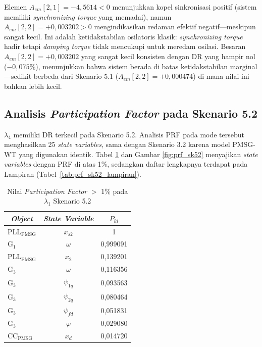 Elemen $A_{em}[2,1] = -4{,}5614 < 0$ menunjukkan kopel sinkronisasi positif
(sistem memiliki \textit{synchronizing torque} yang memadai), namun
$A_{em}[2,2] = +0{,}003202 > 0$ mengindikasikan redaman efektif negatif---meskipun
sangat kecil. Ini adalah ketidakstabilan osilatoris klasik: \textit{synchronizing
torque} hadir tetapi \textit{damping torque} tidak mencukupi untuk meredam osilasi.
Besaran $A_{em}[2,2] = +0{,}003202$ yang sangat kecil konsisten dengan DR yang
hampir nol ($-0{,}075\%$), menunjukkan bahwa sistem berada di batas
ketidakstabilan marginal---sedikit berbeda dari Skenario 5.1
($A_{em}[2,2] = +0{,}000474$) di mana nilai ini bahkan lebih kecil.

\subsection{Analisis \textit{Participation Factor} pada Skenario 5.2}

$\lambda_4$ memiliki DR terkecil pada Skenario 5.2. Analisis PRF pada mode
tersebut menghasilkan 25 \textit{state variables}, sama dengan Skenario 3.2
karena model PMSG-WT yang digunakan identik. Tabel \ref{tab:prf_sk52} dan Gambar \ref{fig:prf_sk52} menyajikan
\textit{state variables} dengan PRF di atas 1\%, sedangkan daftar lengkapnya
terdapat pada Lampiran (Tabel~\ref{tab:prf_sk52_lampiran}).

\begin{table}[h]
	\caption{Nilai \textit{Participation Factor} $>$ 1\% pada $\lambda_1$
	Skenario 5.2}
	\vspace{0.5em}
	\centering
	\fontsize{12}{14.4}\selectfont
	\setlength{\tabcolsep}{10pt}
	\begin{tabular}{l c c}
		\toprule
		\multicolumn{1}{c}{\textbf{\textit{Object}}} & \textbf{\textit{State
		Variable}} & \textbf{$P_{ki}$} \\
		\midrule
		PLL$_\text{PMSG}$ & $x_{s2}$ & 1         \\
		G$_1$ & $\omega$ & 0,999091  \\
		PLL$_\text{PMSG}$ & $x_2$ & 0,139201  \\
		G$_3$ & $\omega$ & 0,116356  \\
		G$_3$ & $\psi_{1q}$ & 0,093563  \\
		G$_3$ & $\psi_{2q}$ & 0,080464  \\
		G$_3$ & $\psi_{fd}$ & 0,051831  \\
		G$_3$ & $\varphi$ & 0,029080  \\
		CC$_\text{PMSG}$ & $x_d$ & 0,014720  \\
		\bottomrule
	\end{tabular}
	\label{tab:prf_sk52}
\end{table}

